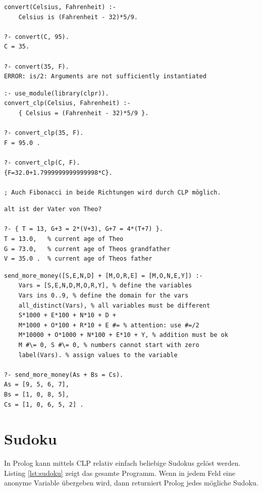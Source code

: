 \begin{lstlisting}[caption=Beispiel ohne CLP]
convert(Celsius, Fahrenheit) :-
	Celsius is (Fahrenheit - 32)*5/9.

?- convert(C, 95).
C = 35.

?- convert(35, F).
ERROR: is/2: Arguments are not sufficiently instantiated
\end{lstlisting}

\begin{lstlisting}[caption=Beispiel mit CLP]
:- use_module(library(clpr)).
convert_clp(Celsius, Fahrenheit) :-
	{ Celsius = (Fahrenheit - 32)*5/9 }.

?- convert_clp(35, F).
F = 95.0 .

?- convert_clp(C, F).
{F=32.0+1.7999999999999998*C}.

; Auch Fibonacci in beide Richtungen wird durch CLP möglich.
\end{lstlisting}

\begin{lstlisting}[caption=Typische CLP Aufgabe]
% Theo ist 13 Jahre alt. In 3 Jahren ist der Grossvater doppelt so alt wie Theo's Vater und in 7 Jahren ist der Grossvater viermal so alt wie Theo. Wie
alt ist der Vater von Theo?

?- { T = 13, G+3 = 2*(V+3), G+7 = 4*(T+7) }.
T = 13.0, 	% current age of Theo
G = 73.0, 	% current age of Theos grandfather
V = 35.0 . 	% current age of Theos father
\end{lstlisting}

\begin{lstlisting}[caption=Zahlenrätsel]
send_more_money([S,E,N,D] + [M,O,R,E] = [M,O,N,E,Y]) :-
	Vars = [S,E,N,D,M,O,R,Y], % define the variables
	Vars ins 0..9, % define the domain for the vars
	all_distinct(Vars), % all variables must be different
	S*1000 + E*100 + N*10 + D +
	M*1000 + O*100 + R*10 + E #= % attention: use #=/2
	M*10000 + O*1000 + N*100 + E*10 + Y, % addition must be ok
	M #\= 0, S #\= 0, % numbers cannot start with zero
	label(Vars). % assign values to the variable

?- send_more_money(As + Bs = Cs).
As = [9, 5, 6, 7],
Bs = [1, 0, 8, 5],
Cs = [1, 0, 6, 5, 2] .
\end{lstlisting}

\section{Sudoku}

In Prolog kann mittels CLP relativ einfach beliebige Sudokus gelöst werden. Listing \ref{lst:sudoku} zeigt das gesamte Programm. Wenn in jedem Feld eine anonyme Variable übergeben wird, dann returniert Prolog jedes mögliche Sudoku.

